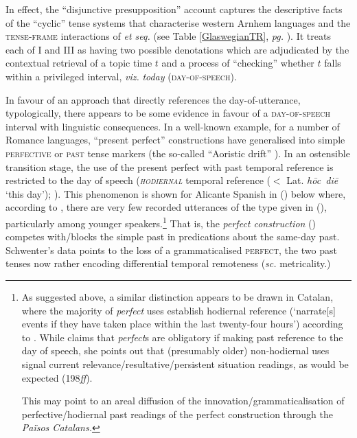 In effect, the ``disjunctive presupposition'' account captures the descriptive facts of the ``cyclic'' tense systems that characterise western Arnhem languages and the \textsc{tense-frame} interactions of \citealt{Glasgow1964} \textit{et seq.} (see Table \ref{GlaswegianTR}, \textit{pg.} \pageref{GlaswegianTR}). It treats each of \gls{I} and \gls{III} as having two possible denotations which are adjudicated by the contextual retrieval of a topic time $ t $ and a process of ``checking'' whether $ t $ falls within a privileged interval, \textit{viz.} \textit{today} \textsc{(day-of-speech)}.

In favour of an approach that directly references the day-of-utterance, typologically, there appears to be some evidence in favour of a \textsc{day-of-speech} interval with linguistic consequences. In a well-known example, for a number of Romance languages, ``present perfect'' constructions have generalised into simple \textsc{perfective} or \textsc{past} tense markers (the so-called ``Aoristic drift'' \citealp[see][]{Schaden2009,Schaden2012}). In an ostensible transition stage, the use of the present perfect with past temporal reference is restricted to the day of speech (\textit{\textsc{hodiernal}} temporal reference ($ < $ Lat. \textit{hōc~diē} `this day');\label{hod} \citealp{Comrie1985,Dahl1985}). This phenomenon is shown for Alicante Spanish in (\nextx) below where, according to \cite{Schwenter1994}, there are very few recorded utterances of the type given in (), particularly among younger speakers.\footnote{
	As suggested above, a similar distinction appears to be drawn in Catalan, where the majority of \textit{perfect} uses establish hodiernal reference (`narrate[s] events if they have taken place within the last twenty-four hours') according to \citet[236--7]{CurelliGotor1990}. While \citeauthor{CurelliGotor1990} claims that \textit{perfect}s are obligatory if making past reference to the day of speech, she points out that (presumably older) non-hodiernal uses signal current relevance/resultative/persistent situation readings, as would be expected  (198\textit{ff}). 
	
	This may point to an areal diffusion of the innovation/grammaticalisation of perfective/hodiernal past readings of the perfect construction through the \textit{Països Catalans.}} That is, the \textit{perfect construction} () competes with/blocks the simple past in predications about the same-day past. Schwenter's data points to the loss of a grammaticalised \textsc{perfect}, the two past tenses now rather encoding differential temporal remoteness (\textit{sc.} metricality.)


